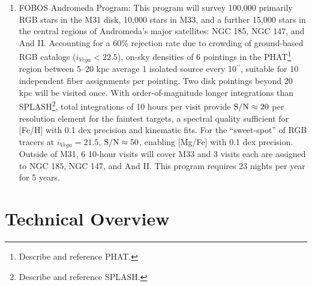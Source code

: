 \documentclass[oneside,11pt]{amsart}
\newcommand{\arcsec}{\mbox{$^{\prime\prime}$}}
\newcommand{\comment}[2][todo]{{\color{#1}[[{\bf #2}]]}}
\newcounter{chalno}
\newcommand{\chal}[1]{\refstepcounter{chalno}\label{#1}}
\begin{document}
\begin{enumerate}[rightmargin=0.2cm,leftmargin=0.2cm]

\chal{stellar} 
%
\item[] {\textsf {\large FOBOS Andromeda Program:}} This program will survey 100,000 primarily RGB stars in the M31 disk, 10,000 stars in M33, and a further 15,000 stars in the central regions of Andromeda's major satellites: NGC 185, NGC 147, and And II.  Accounting for a 60\% rejection rate \citep[see][]{dorman12} due to crowding of ground-based RGB catalogs ($i_{Vega} < 22.5$), on-sky densities of 6 pointings in the PHAT\footnote{Describe and reference PHAT.} region between 5--20 kpc average 1 isolated source every 10\arcsec{}, suitable for 10 independent fiber assignments per pointing.  Two disk pointings beyond 20 kpc will be visited once.  With order-of-magnitude longer integrations than SPLASH\footnote{Describe and reference SPLASH.}, total integrations of 10 hours per visit provide ${\rm S/N} \approx 20$ per resolution element for the faintest targets, a spectral quality sufficient for [Fe/H] with 0.1 dex precision and kinematic fits.  For the ``sweet-spot'' of RGB tracers at $i_{Vega} = 21.5$, ${\rm S/N} \approx 50$, enabling [Mg/Fe] with 0.1 dex precision.  Outside of M31, 6 10-hour visits will cover M33 and 3 visits each are assigned to NGC 185, NGC 147, and And II.  This program requires 23 nights per year for 5 years.  




\end{enumerate}

\section{Technical Overview}
\label{sec:project}


\end{document}
